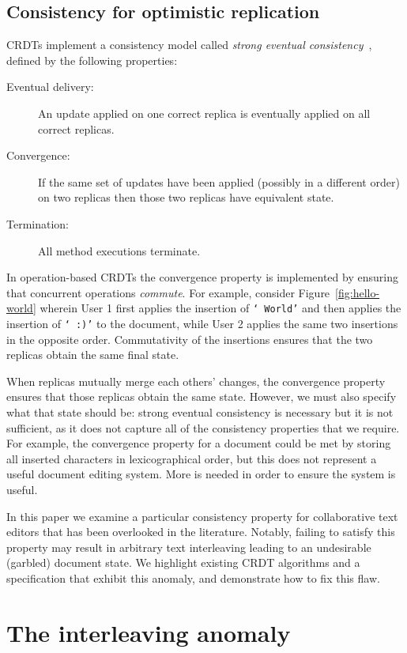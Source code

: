 \documentclass[sigconf]{acmart}
\begin{document}
\subsection{Consistency for optimistic replication}

CRDTs implement a consistency model called \emph{strong eventual consistency}~\cite{Shapiro:2011un,Gomes:2017gy}, defined by the following properties:
\begin{description}
\item[Eventual delivery:] An update applied on one correct replica is eventually applied on all correct replicas.
\item[Convergence:] If the same set of updates have been applied (possibly in a different order) on two replicas then those two replicas have equivalent state.
\item[Termination:] All method executions terminate.
\end{description}
In operation-based CRDTs the convergence property is implemented by ensuring that concurrent operations \emph{commute}.
For example, consider Figure~\ref{fig:hello-world} wherein User 1 first applies the insertion of \texttt{` World'} and then applies the insertion of \texttt{` :)'} to the document, while User 2 applies the same two insertions in the opposite order.
Commutativity of the insertions ensures that the two replicas obtain the same final state.

When replicas mutually merge each others' changes, the convergence property ensures that those replicas obtain the same state.
However, we must also specify what that state should be: strong eventual consistency is necessary but it is not sufficient, as it does not capture all of the consistency properties that we require.
For example, the convergence property for a document could be met by storing all inserted characters in lexicographical order, but this does not represent a useful document editing system.
More is needed in order to ensure the system is useful.

In this paper we examine a particular consistency property for collaborative text editors that has been overlooked in the literature.
Notably, failing to satisfy this property may result in arbitrary text interleaving leading to an undesirable (garbled) document state.
We highlight existing CRDT algorithms and a specification that exhibit this anomaly, and demonstrate how to fix this flaw.

\section{The interleaving anomaly}\label{sec:anomaly}
\end{document}
